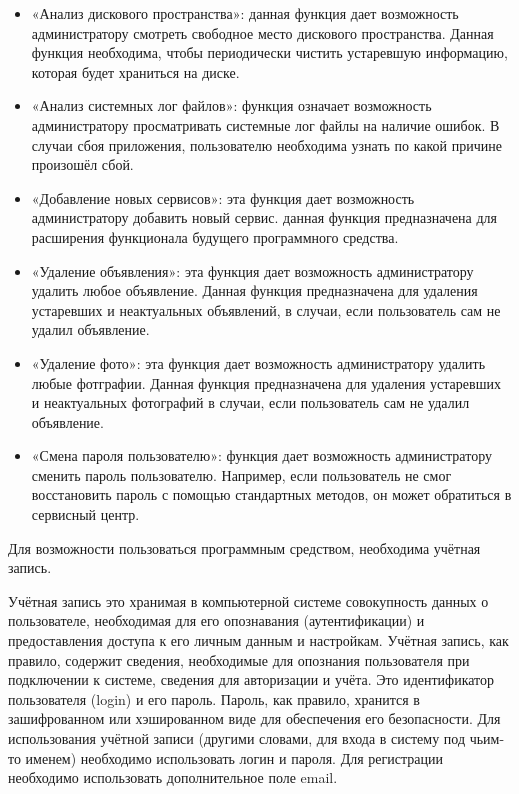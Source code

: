 \begin{itemize}
	\item «Анализ дискового пространства»: данная функция дает возможность администратору смотреть свободное место дискового пространства. Данная функция необходима, чтобы периодически чистить устаревшую информацию, которая будет храниться на диске.
	\item «Анализ системных лог файлов»: функция означает возможность администратору просматривать системные лог файлы на наличие ошибок. В случаи сбоя приложения, пользователю необходима узнать по какой причине произошёл сбой. 
	\item «Добавление новых сервисов»: эта функция дает возможность администратору добавить новый сервис. данная функция предназначена для расширения функционала будущего программного средства. 
	\item «Удаление объявления»: эта функция дает возможность администратору удалить любое объявление. Данная функция предназначена для удаления устаревших и неактуальных объявлений, в случаи, если пользователь сам не удалил объявление.
	\item «Удаление фото»: эта функция дает возможность администратору удалить любые фотграфии. Данная функция предназначена для удаления устаревших и неактуальных фотографий в случаи, если пользователь сам не удалил объявление.
	\item «Смена пароля пользователю»: функция дает возможность администратору сменить пароль пользователю. Например, если пользователь не смог восстановить пароль с помощью стандартных методов, он может обратиться в сервисный центр.
\end{itemize}

Для возможности пользоваться программным средством, необходима учётная запись.  

Учётная запись это хранимая в компьютерной системе совокупность данных о пользователе, необходимая для его опознавания (аутентификации) и предоставления доступа к его личным данным и настройкам. Учётная запись, как правило, содержит сведения, необходимые для опознания пользователя при подключении к системе, сведения для авторизации и учёта. Это идентификатор пользователя (login) и его пароль. Пароль, как правило, хранится в зашифрованном или хэшированном виде для обеспечения его безопасности. Для использования учётной записи (другими словами, для входа в систему под чьим-то именем) необходимо использовать логин и пароля. Для регистрации необходимо использовать дополнительное поле email. 

